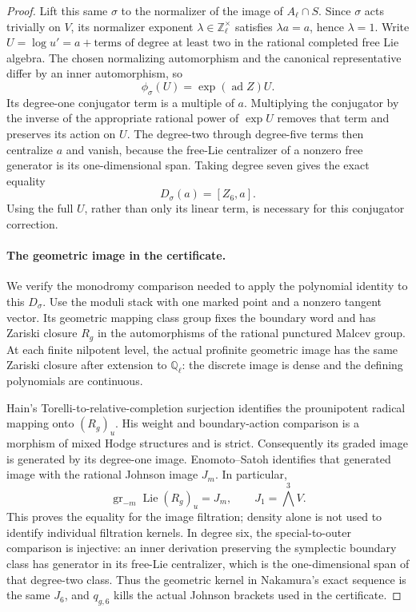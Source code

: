 \documentclass[11pt]{article}
\theoremstyle{definition}\newtheorem{definition}[theorem]{Definition}
\begin{document}
\begin{proof}
Lift this same \(\sigma\) to the normalizer of the image
of \(A_\ell\cap S\).  Since \(\sigma\) acts trivially on \(V\),
its normalizer exponent \(\lambda\in\mathbb Z_\ell^\times\)
satisfies \(\lambda a=a\), hence \(\lambda=1\).
Write \(U=\log u'=a+\text{terms of degree at least two}\)
in the rational completed free Lie algebra.
The chosen normalizing automorphism and the canonical
representative differ by an inner automorphism, so
\[
                 \phi_\sigma(U)=\exp(\operatorname{ad}Z)U.
\]
Its degree-one conjugator term is a multiple of \(a\).
Multiplying the conjugator by the inverse of the appropriate
rational power of \(\exp U\) removes that term and preserves
its action on \(U\).
The degree-two through degree-five terms then centralize \(a\)
and vanish, because the free-Lie centralizer of a nonzero
free generator is its one-dimensional span.
Taking degree seven gives the exact equality
\begin{equation}\label{eq:geo-normalizer-tangency}
                         D_\sigma(a)=[Z_6,a].
\end{equation}
Using the full \(U\), rather than only its linear term,
is necessary for this conjugator correction.

\paragraph{The geometric image in the certificate.}
We verify the monodromy comparison needed to apply the
polynomial identity to this \(D_\sigma\).
Use the moduli stack with one marked point and a nonzero
tangent vector.  Its geometric mapping class group fixes
the boundary word and has Zariski closure \(R_g\) in
the automorphisms of the rational punctured Malcev group.
At each finite nilpotent level, the actual profinite
geometric image has the same Zariski closure after
extension to \(\mathbb Q_\ell\): the discrete image is
dense and the defining polynomials are continuous.

Hain's Torelli-to-relative-completion surjection
\cite[Theorem 3.4, p.~605]{Hain1997} identifies the
prounipotent radical mapping onto \((R_g)_u\).
His weight and boundary-action comparison
\cite[Theorem 4.10, p.~611; Remark 4.11, p.~613;
\S14.4, p.~643]{Hain1997} is a morphism of mixed
Hodge structures and is strict.
Consequently its graded image is generated by its
degree-one image.  Enomoto--Satoh
\cite[Theorem 3.5 and Proposition 3.6, p.~640]{EnomotoSatoh2014}
identifies that generated image with the rational Johnson
image \(J_m\).  In particular,
\[
              \operatorname{gr}_{-m}\operatorname{Lie}(R_g)_u=J_m,
              \qquad J_1=\bigwedge^3V.
\]
This proves the equality for the image filtration; density
alone is not used to identify individual filtration kernels.
In degree six, the special-to-outer comparison is injective:
an inner derivation preserving the symplectic boundary class
has generator in its free-Lie centralizer, which is the
one-dimensional span of that degree-two class.
Thus the geometric kernel in Nakamura's exact sequence is
the same \(J_6\), and \(q_{g,6}\) kills the actual Johnson
brackets used in the certificate.


\end{proof}
\end{document}
